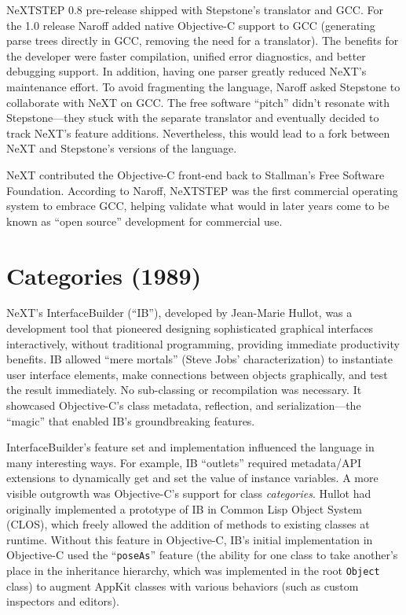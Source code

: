 \documentclass[acmsmall]{acmart}\settopmatter{}
\begin{document}
NeXTSTEP 0.8 pre-release shipped with Stepstone's translator and GCC. For the 1.0 release Naroff added native Objective-C support to GCC (generating parse trees directly in GCC, removing the need for a translator). The benefits for the developer were faster compilation, unified error diagnostics, and better debugging support. In addition, having one parser greatly reduced NeXT's maintenance effort. To avoid fragmenting the language, Naroff asked Stepstone to collaborate with NeXT on GCC. The free software ``pitch'' didn't resonate with Stepstone---they stuck with the separate translator and eventually decided to track NeXT's feature additions. Nevertheless, this would lead to a fork between NeXT and Stepstone's versions of the language.

NeXT contributed the Objective-C front-end back to Stallman's Free Software Foundation. According to Naroff, NeXTSTEP was the first commercial operating system to embrace GCC, helping validate what would in later years come to be known as ``open source'' development for commercial use.

\section{Categories (1989)}
\label{sec-categories1989}
NeXT's InterfaceBuilder (``IB''), developed by Jean-Marie Hullot, was a development tool that pioneered designing sophisticated graphical interfaces interactively, without traditional programming, providing immediate productivity benefits. IB allowed ``mere mortals'' (Steve Jobs' characterization) to instantiate user interface elements, make connections between objects graphically, and test the result immediately. No sub-classing or recompilation was necessary. It showcased Objective-C's class metadata, reflection, and serialization---the ``magic'' that enabled IB's groundbreaking features.

InterfaceBuilder's feature set and implementation influenced the language in many interesting ways. For example, IB ``outlets'' required metadata/API extensions to dynamically get and set the value of instance variables. A more visible outgrowth was Objective-C's support for class \emph{categories}. Hullot had originally implemented a prototype of IB in Common Lisp Object System (CLOS), which freely allowed the addition of methods to existing classes at runtime. Without this feature in Objective-C, IB's initial implementation in Objective-C used the ``\verb$poseAs$'' feature (the ability for one class to take another's place in the inheritance hierarchy, which was implemented in the root \verb$Object$ class) to augment AppKit classes with various behaviors (such as custom inspectors and editors).
\end{document}

